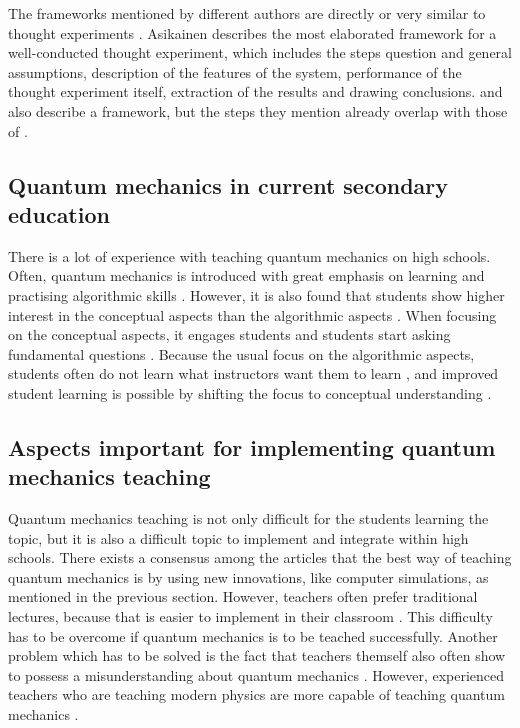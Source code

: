 \documentclass[11pt,twoside]{report} %
\begin{document}
The frameworks mentioned by different authors are directly or very similar to thought experiments \cite{asikainen, erduran, levrini, velentzas}. Asikainen describes the most elaborated framework for a well-conducted thought experiment, which includes the steps question and general assumptions, description of the features of the system, performance of the thought experiment itself, extraction of the results and drawing conclusions.  and  also describe a framework, but the steps they mention already overlap with those of .

\subsection{Quantum mechanics in current secondary education}

There is a lot of experience with teaching quantum mechanics on high schools. Often, quantum mechanics is introduced with great emphasis on learning and practising algorithmic skills \cite{papaphotis1,papaphotis2}. However, it is also found that students show higher interest in the conceptual aspects than the algorithmic aspects \cite{papaphotis1,papaphotis2,levrini}. When focusing on the conceptual aspects, it engages students \cite{henriksen} and students start asking fundamental questions \cite{mckagan}. Because the usual focus on the algorithmic aspects, students often do not learn what instructors want them to learn \cite{asikainen, mckagan}, and improved student learning is possible by shifting the focus to conceptual understanding \cite{mckagan}.

\subsection{Aspects important for implementing quantum mechanics teaching}

Quantum mechanics teaching is not only difficult for the students learning the topic, but it is also a difficult topic to implement and integrate within high schools. There exists a consensus among the articles that the best way of teaching quantum mechanics is by using new innovations, like computer simulations, as mentioned in the previous section. However, teachers often prefer traditional lectures, because that is easier to implement in their classroom \cite{adegoke}. This difficulty has to be overcome if quantum mechanics is to be teached successfully. Another problem which has to be solved is the fact that teachers themself also often show to possess a misunderstanding about quantum mechanics \cite{asikainen}. However, experienced teachers who are teaching modern physics are more capable of teaching quantum mechanics \cite{asikainen}.
\end{document}
